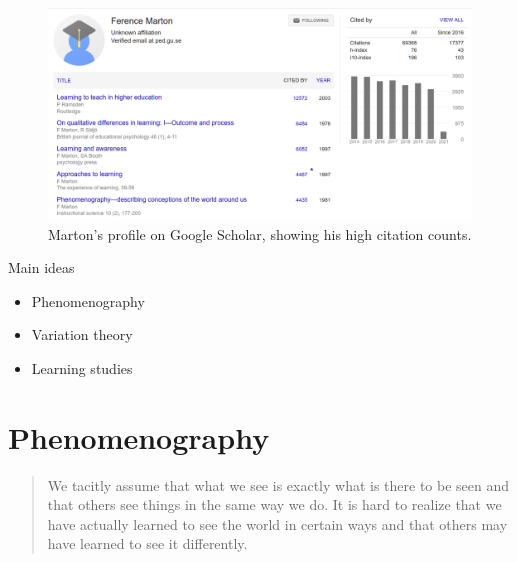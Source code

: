 \begin{frame}
  \begin{figure}
    \includegraphics[width=\columnwidth]{fig/marton-gscholar.png}
    \caption{Marton's profile on Google Scholar, showing his high citation 
    counts.}
  \end{figure}
\end{frame}

\begin{frame}
  \begin{block}{Main ideas}
    \begin{itemize}
      \item Phenomenography~\cite{Phenomenography}
      \item Variation theory~\cite{VariationTheory}
      \item Learning studies~\cite{LearningStudy}
    \end{itemize}
  \end{block}
\end{frame}

\section{Phenomenography}

\begin{frame}
  \blockcquote{NecessaryConditionsOfLearning}{%
    We tacitly assume that what we see is exactly what is there to be seen and 
    that others see things in the same way we do. It is hard to realize that we 
    have actually learned to see the world in certain ways and that others may 
    have learned to see it differently.
  }
\end{frame}

